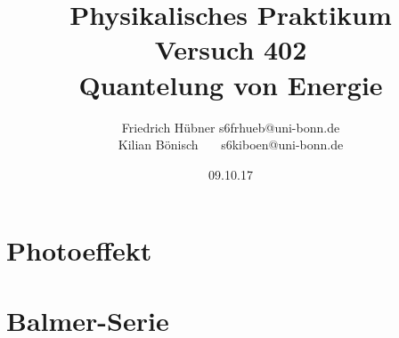 \documentclass{article}
\newcommand{\RM}[1]{\MakeUppercase{\romannumeral #1}}
\begin{document}
\setlength{\parindent}{0em}   %
\title{Physikalisches Praktikum \RM{4}\\Versuch 402\\Quantelung von Energie}
\author{Friedrich Hübner \qquad s6frhueb@uni-bonn.de \\
  Kilian Bönisch \ \ \ \qquad s6kiboen@uni-bonn.de }
\date{09.10.17}

\maketitle

\thispagestyle{empty}

\newpage



\section{Photoeffekt}





\section{Balmer-Serie}




\FloatBarrier
\printbibliography
\end{document}
